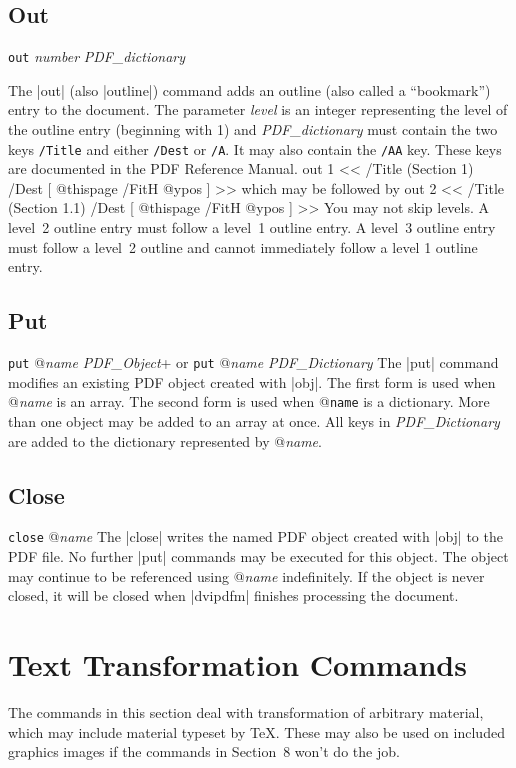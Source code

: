 {{\subsection{Out}
\syntax
{\tt out} {\it number} {\it PDF\_dictionary}

\description
The |out| (also |outline|) command adds an outline (also called a ``bookmark'') entry
to the document.
The parameter {\it level\/} is an integer representing the
level of the outline entry (beginning with 1) and
{\it  PDF\_dictionary\/} must contain
the two keys {\tt /Title} and either {\tt /Dest} or {\tt /A}.
It may also contain the {\tt /AA} key.  These keys are documented
in the PDF Reference Manual.
\example
\begintt
out 1 << /Title (Section 1) /Dest [ @thispage /FitH @ypos ] >>
\endtt
which may be followed by
\begintt
out 2 << /Title (Section 1.1) /Dest [ @thispage /FitH @ypos ] >>
\endtt
\note
You may not skip levels.  A level~2 outline entry
must follow a level~1 outline
entry.  A level~3 outline entry must follow a level~2 outline
and cannot immediately follow a level 1 outline entry.

\subsection{Put}
\syntax
\beginlist
{\tt put} @{\it name} {\it PDF\_Object}+
\endlist
or 
\beginlist
{\tt put} @{\it name} {\it PDF\_Dictionary}
\endlist
\description
The |put| command modifies an existing PDF object created with |obj|.
The first form is used when @{\it name} is an array.  The second
form is used when @{\tt name} is a dictionary.  More than
one object may be added to an array at once.
All keys in {\it PDF\_Dictionary}
are added to the dictionary represented by @{\it name}.
\example
\begintt
{}
\endtt

\subsection{Close}
\syntax
{\tt close} @{\it name}
\description
The |close| writes the named PDF object created with |obj| to the PDF file.
No further |put| commands may be executed for this object.
The object may continue to be referenced using @{\it name}
indefinitely.  If the object is never closed, it will
be closed when |dvipdfm| finishes processing the document.

\section{Text Transformation Commands}
The commands in this section deal with transformation
of arbitrary material, which may include
material typeset by \TeX.  These
may also be used on included graphics images
if the commands in Section~8 won't do the job.


}}
